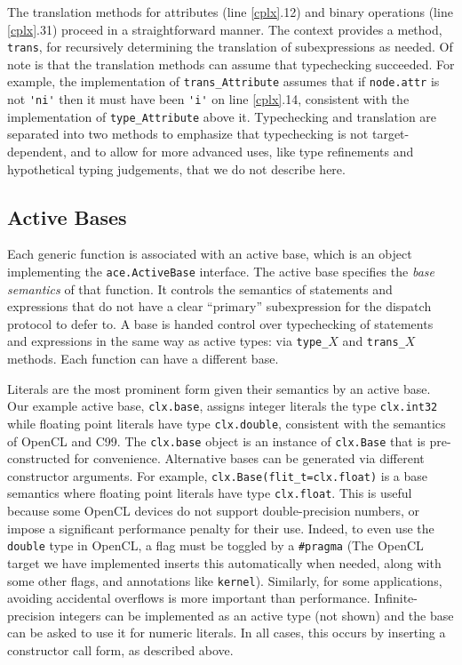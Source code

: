 \documentclass[9pt,preprint]{sigplanconf}
\begin{document}
The translation methods for attributes (line \ref{cplx}.12) and binary operations  (line \ref{cplx}.31) proceed in a straightforward manner. The context provides a method, \verb|trans|, for recursively determining the translation of subexpressions as needed. Of note is that the translation methods can assume that typechecking succeeded. For example, the implementation of \verb|trans_Attribute| assumes that if \verb|node.attr| is not \verb|'ni'| then it must have been \verb|'i'| on line \ref{cplx}.14, consistent with the implementation of \verb|type_Attribute| above it. Typechecking and translation are separated into two methods to emphasize that typechecking is not target-dependent, and to allow for more advanced uses, like type refinements and hypothetical typing judgements, that we do not describe here.

\subsection{Active Bases}\label{abases}
Each generic function is associated with an active base, which is an object implementing the \verb|ace.ActiveBase| interface. The active base specifies the \emph{base semantics} of that function. It controls the semantics of statements and expressions that do not have a clear ``primary'' subexpression for the dispatch protocol to defer to. A base is handed control over typechecking of statements and expressions in the same way as active types: via \verb|type_|$X$ and \verb|trans_|$X$ methods.  Each function can have a different base.

Literals are the most prominent form given their semantics by an active base. Our example active base, \verb|clx.base|, assigns integer literals the type \verb|clx.int32| while floating point literals have type \verb|clx.double|, consistent with the semantics of OpenCL and C99. The \verb|clx.base| object is an instance of \verb|clx.Base| that is pre-constructed for convenience. Alternative bases can be generated via different constructor arguments. For example, \verb|clx.Base(flit_t=clx.float)| is a base semantics where floating point literals have type \verb|clx.float|. This is useful because some OpenCL devices do not support double-precision numbers, or impose a significant performance penalty for their use. Indeed, to even use the \verb|double| type in OpenCL, a flag must be toggled by a \verb|#pragma| (The OpenCL target we have implemented inserts this automatically when needed, along with some other flags, and annotations like \verb|kernel|).  Similarly, for some applications, avoiding accidental overflows is more important than performance.  Infinite-precision integers can be implemented as an active type (not shown) and the base can be asked to use it for numeric literals. In all cases, this occurs by inserting a constructor call form, as described above.%
\end{document}
